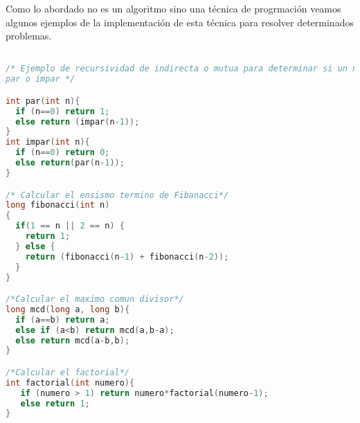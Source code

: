 Como lo abordado no es un algoritmo sino una técnica de progrmación veamos algunos ejemplos de la implementación de esta técnica para resolver determinados problemas.

\begin{lstlisting}[language=C++]

/* Ejemplo de recursividad de indirecta o mutua para determinar si un numero positivo es
par o impar */

int par(int n){
  if (n==0) return 1;
  else return (impar(n-1));
}
int impar(int n){
  if (n==0) return 0; 
  else return(par(n-1));
}

/* Calcular el ensismo termino de Fibanacci*/
long fibonacci(int n)
{
  if(1 == n || 2 == n) {
    return 1;
  } else {
    return (fibonacci(n-1) + fibonacci(n-2));
  }
}

/*Calcular el maximo comun divisor*/
long mcd(long a, long b){
  if (a==b) return a;
  else if (a<b) return mcd(a,b-a);
  else return mcd(a-b,b);
}

/*Calcular el factorial*/
int factorial(int numero){
   if (numero > 1) return numero*factorial(numero-1);
   else return 1;
}
\end{lstlisting} 